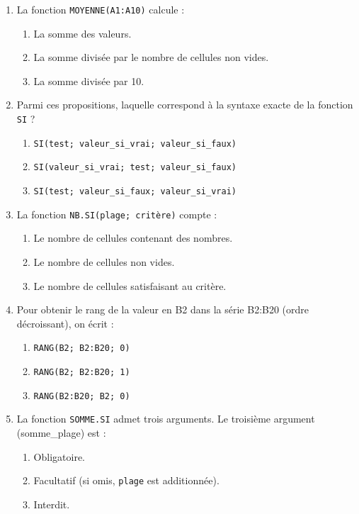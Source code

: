 \documentclass[11pt]{article}
\begin{document}
\begin{exercice}
\begin{enumerate}
    \item La fonction \texttt{MOYENNE(A1:A10)} calcule :
    \begin{enumerate}
        \item La somme des valeurs.
        \item La somme divisée par le nombre de cellules non vides.
        \item La somme divisée par 10.
    \end{enumerate}
    \item Parmi ces propositions, laquelle correspond à la syntaxe exacte de la fonction \texttt{SI} ?
    \begin{enumerate}
        \item \texttt{SI(test; valeur\_si\_vrai; valeur\_si\_faux)}
        \item \texttt{SI(valeur\_si\_vrai; test; valeur\_si\_faux)}
        \item \texttt{SI(test; valeur\_si\_faux; valeur\_si\_vrai)}
    \end{enumerate}
    \item La fonction \texttt{NB.SI(plage; critère)} compte :
    \begin{enumerate}
        \item Le nombre de cellules contenant des nombres.
        \item Le nombre de cellules non vides.
        \item Le nombre de cellules satisfaisant au critère.
    \end{enumerate}
    \item Pour obtenir le rang de la valeur en B2 dans la série B2:B20 (ordre décroissant), on écrit :
    \begin{enumerate}
        \item \texttt{RANG(B2; B2:B20; 0)}
        \item \texttt{RANG(B2; B2:B20; 1)}
        \item \texttt{RANG(B2:B20; B2; 0)}
    \end{enumerate}
    \item La fonction \texttt{SOMME.SI} admet trois arguments. Le troisième argument (somme\_plage) est :
    \begin{enumerate}
        \item Obligatoire.
        \item Facultatif (si omis, \texttt{plage} est additionnée).
        \item Interdit.
    \end{enumerate}
\end{enumerate}
\end{exercice}
\end{document}
